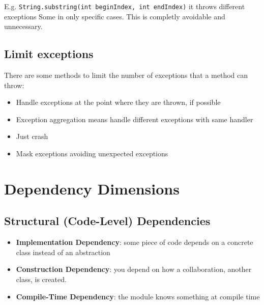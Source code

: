 E.g. \texttt{String.substring(int beginIndex, int endIndex)} it throws different exceptions Some in only specific cases.
This is completly avoidable and unnecessary.


\subsection{Limit exceptions}
There are some methods to limit the number of exceptions that a method can throw:

\begin{itemize}
  \item Handle exceptions at the point where they are thrown, if possible
  \item Exception aggregation means handle different exceptions with same handler
  \item Just crash
  \item Mask exceptions avoiding unexpected exceptions
\end{itemize}


\section{Dependency Dimensions}


\subsection{Structural (Code-Level) Dependencies}

\begin{itemize}
  \item \textbf{Implementation Dependency}: some piece of code depends on a concrete class instead of an abstraction
  \item \textbf{Construction Dependency}: you depend on how a collaboration, another class, is created.
  \item \textbf{Compile-Time Dependency}: the module knows something at compile time
\end{itemize}

